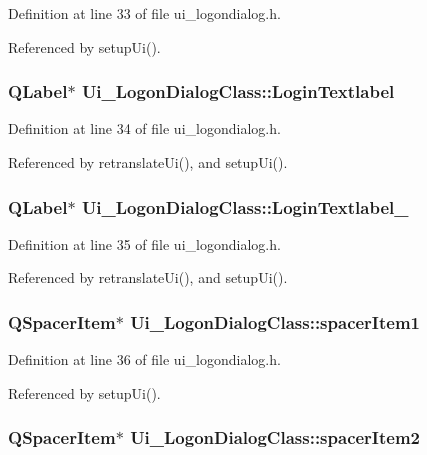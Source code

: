 Definition at line 33 of file ui\_\-logondialog.h.

Referenced by setupUi().\hypertarget{class_ui___logon_dialog_class_799b450829800de3f59c90212c578c8a}{
\subsubsection[LoginTextlabel]{\setlength{\rightskip}{0pt plus 5cm}QLabel$\ast$ {\bf Ui\_\-LogonDialogClass::LoginTextlabel}}}
\label{class_ui___logon_dialog_class_799b450829800de3f59c90212c578c8a}




Definition at line 34 of file ui\_\-logondialog.h.

Referenced by retranslateUi(), and setupUi().\hypertarget{class_ui___logon_dialog_class_6094bf55772b49a1910aa264b8073a37}{
\subsubsection[LoginTextlabel\_\-2]{\setlength{\rightskip}{0pt plus 5cm}QLabel$\ast$ {\bf Ui\_\-LogonDialogClass::LoginTextlabel\_}}}
\label{class_ui___logon_dialog_class_6094bf55772b49a1910aa264b8073a37}




Definition at line 35 of file ui\_\-logondialog.h.

Referenced by retranslateUi(), and setupUi().\hypertarget{class_ui___logon_dialog_class_f838e191fe50009cbf8f8c599468d00e}{
\subsubsection[spacerItem1]{\setlength{\rightskip}{0pt plus 5cm}QSpacerItem$\ast$ {\bf Ui\_\-LogonDialogClass::spacerItem1}}}
\label{class_ui___logon_dialog_class_f838e191fe50009cbf8f8c599468d00e}




Definition at line 36 of file ui\_\-logondialog.h.

Referenced by setupUi().\hypertarget{class_ui___logon_dialog_class_57c7c653c9e951e74cb5fd926f1243c8}{
\subsubsection[spacerItem2]{\setlength{\rightskip}{0pt plus 5cm}QSpacerItem$\ast$ {\bf Ui\_\-LogonDialogClass::spacerItem2}}}
\label{class_ui___logon_dialog_class_57c7c653c9e951e74cb5fd926f1243c8}




